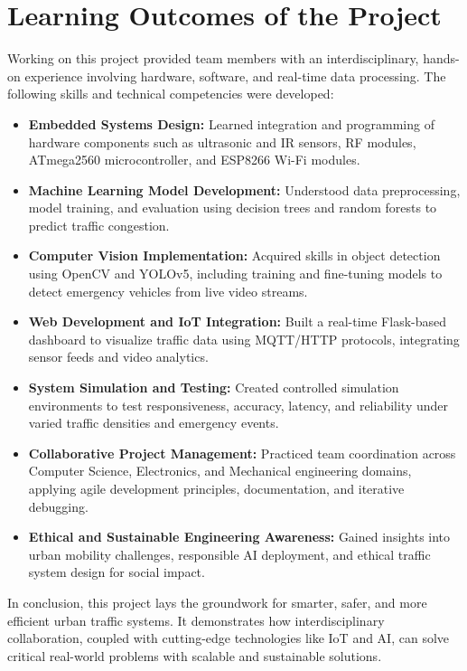 \section{Learning Outcomes of the Project}

Working on this project provided team members with an interdisciplinary, hands-on experience involving hardware, software, and real-time data processing. The following skills and technical competencies were developed:

\begin{itemize}
    \item \textbf{Embedded Systems Design:} Learned integration and programming of hardware components such as ultrasonic and IR sensors, RF modules, ATmega2560 microcontroller, and ESP8266 Wi-Fi modules.
    
    \item \textbf{Machine Learning Model Development:} Understood data preprocessing, model training, and evaluation using decision trees and random forests to predict traffic congestion.
    
    \item \textbf{Computer Vision Implementation:} Acquired skills in object detection using OpenCV and YOLOv5, including training and fine-tuning models to detect emergency vehicles from live video streams.
    
    \item \textbf{Web Development and IoT Integration:} Built a real-time Flask-based dashboard to visualize traffic data using MQTT/HTTP protocols, integrating sensor feeds and video analytics.
    
    \item \textbf{System Simulation and Testing:} Created controlled simulation environments to test responsiveness, accuracy, latency, and reliability under varied traffic densities and emergency events.
    
    \item \textbf{Collaborative Project Management:} Practiced team coordination across Computer Science, Electronics, and Mechanical engineering domains, applying agile development principles, documentation, and iterative debugging.
    
    \item \textbf{Ethical and Sustainable Engineering Awareness:} Gained insights into urban mobility challenges, responsible AI deployment, and ethical traffic system design for social impact.
\end{itemize}

\vspace{0.5cm}

In conclusion, this project lays the groundwork for smarter, safer, and more efficient urban traffic systems. It demonstrates how interdisciplinary collaboration, coupled with cutting-edge technologies like IoT and AI, can solve critical real-world problems with scalable and sustainable solutions.